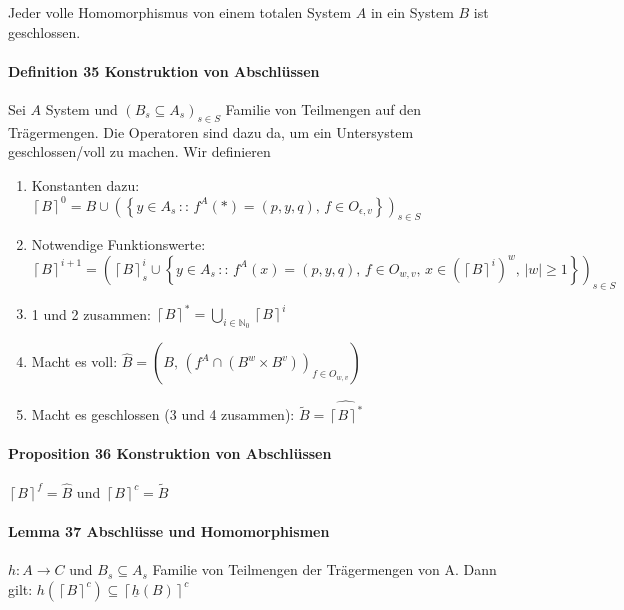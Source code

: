 Jeder volle Homomorphismus von einem totalen System $A$ in ein System $B$ ist geschlossen.

\paragraph{Definition 35 Konstruktion von Abschlüssen}
Sei $A$
System und $\left(B_{s}\subseteq A_{s}\right)_{s\in S}$ Familie von Teilmengen auf den Trägermengen. 
Die Operatoren sind dazu da, um ein Untersystem geschlossen/voll zu machen.
Wir definieren
\begin{enumerate}
\item Konstanten dazu: $\left\lceil B\right\rceil ^{0}=B\cup\left(\left\{ y\in A_{s}\,::\, f^{A}(*)=(p,y,q),\, f\in O_{\epsilon,v}\right\} \right)_{s\in S}$
\item Notwendige Funktionswerte: \\ $\left\lceil B\right\rceil ^{i+1} =\left(\left\lceil B\right\rceil _{s}^{i}\cup\left\{ y\in A_{s}\,::\, f^{A}(x)=(p,y,q),\, f\in O_{w,v},\, x\in\left(\left\lceil B\right\rceil ^{i}\right)^{w},\,|w|\geq1\right\} \right)_{s\in S}$
\item 1 und 2 zusammen: $\left\lceil B\right\rceil ^{*}=\bigcup_{i\in\mathbb{N}_{0}}\left\lceil B\right\rceil ^{i}$
\item Macht es voll:  $\widehat{B}=\left(B,\,\left(f^{A}\cap\left(B^{w}\times B^{v}\right)\right)_{f\in O_{w,v}}\right)$
\item Macht es geschlossen (3 und 4 zusammen):  $\widetilde{B}=\widehat{\left\lceil B\right\rceil ^{*}}$
\end{enumerate}

\paragraph{Proposition 36 Konstruktion von Abschlüssen}

$\left\lceil B\right\rceil ^{f}=\widehat{B}$
und \textup{$\left\lceil B\right\rceil ^{c}=\widetilde{B}$}
\newpage

\paragraph{Lemma 37 Abschlüsse und Homomorphismen}
$h: A \rightarrow C$ und $B_s \subseteq A_s$ Familie von Teilmengen der Trägermengen von A. Dann gilt: $h(\left \lceil B \right \rceil^c) \subseteq \left \lceil \underline{h}(B) \right \rceil^c$

